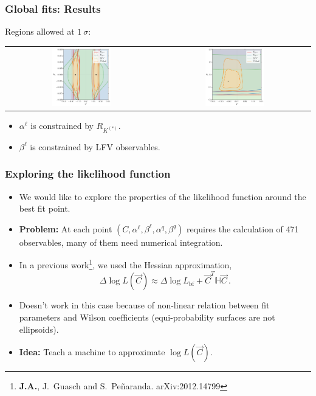 \documentclass[mathserif, 10pt]{beamer}
\begin{document}
\begin{frame}
\frametitle{Global fits: Results}
Regions allowed at $1~\sigma$:
\begin{center}
\begin{tabular}{cc}
  \includegraphics[width=0.4\textwidth]{figures/alphabeta_l.pdf} & \includegraphics[width=0.4\textwidth]{figures/alphabeta_q.pdf}
\end{tabular}
\end{center}
\begin{itemize}
  \item $\alpha^\ell$ is constrained by $R_{K^{(*)}}$.
  \item $\beta^\ell$ is constrained by LFV observables.
\end{itemize}
\end{frame}

\begin{frame}
    \frametitle{Exploring the likelihood function}

    \begin{itemize}
        \item We would like to explore the properties of the likelihood function around the best fit point.
        \item {\bf Problem:} At each point $(C, \alpha^\ell, \beta^\ell, \alpha^q, \beta^q)$ requires the calculation of 471 observables, many of them need numerical integration.
        \item In a previous work\footnote[1]{\textbf{J.A.}, J.~Guasch and S.~Pe\~naranda. arXiv:2012.14799}, we used the Hessian approximation,
        $$\Delta\log L (\vec{C}) \approx \Delta\log L_\mathrm{bf} + \vec{C}^T \mathbb{H} \vec{C}\,.$$
        \item Doesn't work in this case because of non-linear relation between fit parameters and Wilson coefficients (equi-probability surfaces are not ellipsoids).
        \item {\bf Idea:} Teach a machine to approximate $\log L(\vec{C})$.
    \end{itemize}

\end{frame}
\end{document}
